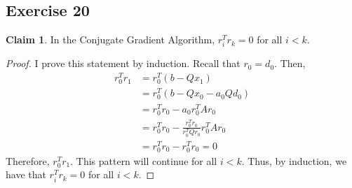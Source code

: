 \documentclass[letterpaper,12pt]{article}
\theoremstyle{definition}
\newtheorem{claim}[theorem]{Claim}
\begin{document}
\subsection*{Exercise 20}
\begin{claim}
In the Conjugate Gradient Algorithm, $r^T_i r_k = 0$ for all $i <k $. 
\end{claim}
\begin{proof}
I prove this statement by induction. Recall that $r_0 = d_0$. Then,
\begin{align*}
	r_0^T r_1 &= r_0^T(b - Qx_1) \\
	&= r_0^T(b - Qx_0 - a_0 Q d_0) \\
	&= r_0^T r_0 - a_0 r_0^T A r_0 \\
	&= r_0^T r_0 - \frac{r_0^T r_0}{r_0^T Q r_0} r_0^T A r_0 \\ 
	&=  r_0^T r_0 -  r_0^T r_0 = 0
\end{align*}
Therefore, $r_0^T r_1$. This pattern will continue for all $i <k $. Thus, by induction, we have that $r^T_i r_k = 0$ for all $i <k $. 
\end{proof}
\end{document}
